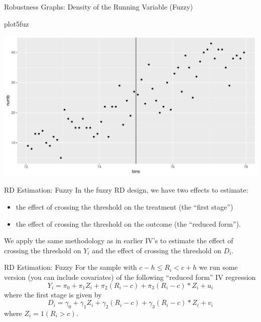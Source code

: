 \documentclass[
  ignorenonframetext,
]{beamer}
\newenvironment{Shaded}{\begin{snugshade}}{\end{snugshade}}
\newcommand{\NormalTok}[1]{#1}
\begin{document}
\begin{frame}[fragile]{Robustness Graphs: Density of the Running
Variable (Fuzzy)}
\protect\hypertarget{robustness-graphs-density-of-the-running-variable-fuzzy-1}{}
\begin{Shaded}
\begin{Highlighting}[]
\NormalTok{plot5fuz}
\end{Highlighting}
\end{Shaded}

\includegraphics{Slides9_RD_files/figure-beamer/fuz5a-1.pdf}
\end{frame}

\begin{frame}{RD Estimation: Fuzzy}
\protect\hypertarget{rd-estimation-fuzzy}{}
In the fuzzy RD design, we have two effects to estimate:

\begin{itemize}
\item
  the effect of crossing the threshold on the treatment (the ``first
  stage'')
\item
  the effect of crossing the threshold on the outcome (the ``reduced
  form'').
\end{itemize}

We apply the same methodology as in earlier IV's to estimate the effect
of crossing the threshold on \(Y_i\) and the effect of crossing the
threshold on \(D_i\).
\end{frame}

\begin{frame}{RD Estimation: Fuzzy}
\protect\hypertarget{rd-estimation-fuzzy-1}{}
For the sample with \(c-h \leq R_i< c+h\) we run some version (you can
include covariates) of the following ``reduced form'' IV regression \[
Y_i=\pi_0+\pi_1Z_i+\pi_2(R_i-c)+\pi_3(R_i-c)*Z_i+u_i 
\] where the first stage is given by \[
D_i=\gamma_0+\gamma_1Z_i+\gamma_2(R_i-c)+\gamma_3(R_i-c)*Z_i+v_i
\] where \(Z_i=1(R_i> c)\).
\end{frame}
\end{document}
